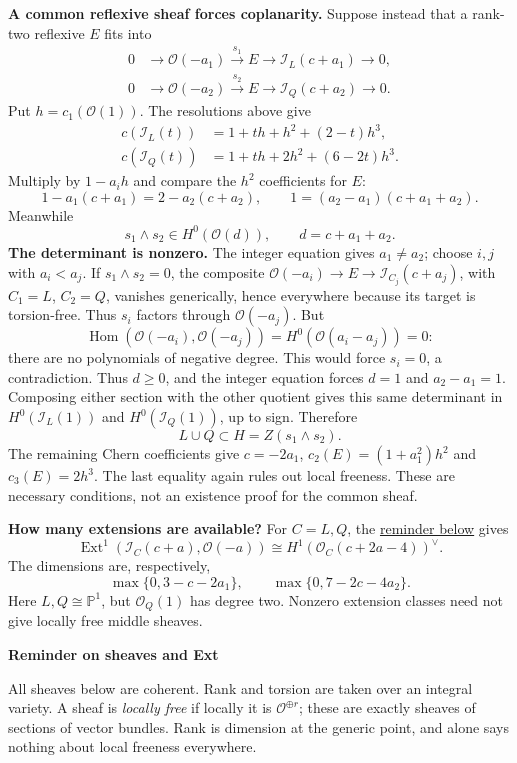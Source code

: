 \textbf{A common reflexive sheaf forces
coplanarity.}
Suppose instead that a rank-two
reflexive $E$ fits into
$$
\begin{aligned}
0&\to\mathcal{O}(-a_1)\xrightarrow{s_1}E
\to\mathcal{I}_L(c+a_1)\to0,\\
0&\to\mathcal{O}(-a_2)\xrightarrow{s_2}E
\to\mathcal{I}_Q(c+a_2)\to0.
\end{aligned}
$$
Put $h=c_1(\mathcal{O}(1))$.
The resolutions above give
$$
\begin{aligned}
c(\mathcal{I}_L(t))
&=1+th+h^2+(2-t)h^3,\\
c(\mathcal{I}_Q(t))
&=1+th+2h^2+(6-2t)h^3.
\end{aligned}
$$
Multiply by $1-a_i h$ and compare
the $h^2$ coefficients for $E$:
$$
1-a_1(c+a_1)=2-a_2(c+a_2),
\qquad
1=(a_2-a_1)(c+a_1+a_2).
$$
Meanwhile
$$
s_1\wedge s_2\in H^0(\mathcal{O}(d)),
\qquad d=c+a_1+a_2.
$$
\textbf{The determinant is nonzero.}
The integer equation gives $a_1\ne a_2$;
choose $i,j$ with $a_i<a_j$.
If $s_1\wedge s_2=0$, the composite
$\mathcal{O}(-a_i)\to E\to
\mathcal{I}_{C_j}(c+a_j)$, with
$C_1=L$, $C_2=Q$, vanishes generically,
hence everywhere because its target
is torsion-free. Thus $s_i$ factors
through $\mathcal{O}(-a_j)$. But
$$
\operatorname{Hom}(\mathcal{O}(-a_i),
\mathcal{O}(-a_j))
=H^0(\mathcal{O}(a_i-a_j))=0:
$$
there are no polynomials of negative
degree. This would force $s_i=0$,
a contradiction.
Thus $d\geq0$, and the integer equation
forces $d=1$ and $a_2-a_1=1$.
Composing either section with the other
quotient gives this same determinant
in $H^0(\mathcal{I}_L(1))$ and
$H^0(\mathcal{I}_Q(1))$, up to sign.
Therefore
$$
\boxed{L\cup Q\subset H=Z(s_1\wedge s_2).}
$$
The remaining Chern coefficients give
$c=-2a_1$, $c_2(E)=(1+a_1^2)h^2$ and
$c_3(E)=2h^3$. The last equality again
rules out local freeness. These are
necessary conditions, not an existence
proof for the common sheaf.

\textbf{How many extensions are available?}
For $C=L,Q$, the
\hyperref[paragraph-jardim-sheaves]
{reminder below} gives
$$
\operatorname{Ext}^1
(\mathcal{I}_C(c+a),\mathcal{O}(-a))
\cong H^1(\mathcal{O}_C(c+2a-4))^\vee.
$$
The dimensions are, respectively,
$$
\max\{0,3-c-2a_1\},\qquad
\max\{0,7-2c-4a_2\}.
$$
Here $L,Q\cong\mathbb{P}^1$, but
$\mathcal{O}_Q(1)$ has degree two.
Nonzero extension classes need not give
locally free middle sheaves.

\medskip\noindent
{}
\label{paragraph-jardim-sheaves}
\textbf{Reminder on sheaves and Ext}
\par\nopagebreak\noindent
All sheaves below are coherent.
Rank and torsion are taken over an
integral variety. A sheaf is
\emph{locally free} if locally it is
$\mathcal{O}^{\oplus r}$; these are
exactly sheaves of sections of vector
bundles. Rank is dimension at the
generic point, and alone says nothing
about local freeness everywhere.


